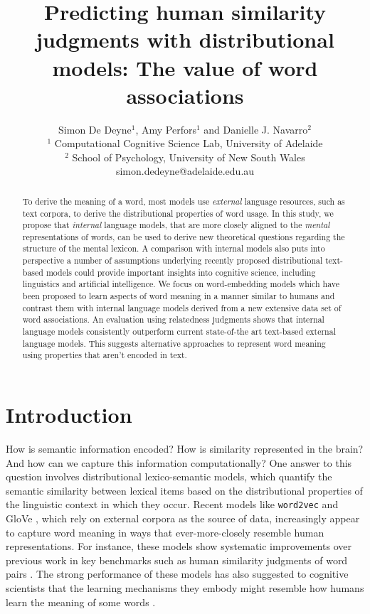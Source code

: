 \documentclass{article}
\title{Predicting human similarity judgments with distributional models: The value of word associations}
\author{Simon De Deyne$^1$, Amy Perfors$^1$ and Danielle J. Navarro$^2$ \\
$^1$ Computational Cognitive Science Lab, University of Adelaide  \\
$^2$ School of Psychology, University of New South Wales\\
 simon.dedeyne@adelaide.edu.au}
\date{}
\begin{document}
\maketitle

\begin{abstract}

To derive the meaning of a word, most models use \textit{external} language resources, such as text corpora, to derive the distributional properties of word usage.
In this study, we propose that \textit{internal} language models, that are more closely aligned to the \textit{mental} representations of words, can be used to derive new theoretical questions regarding the structure of the mental lexicon. A comparison with internal models also puts into perspective a number of assumptions underlying recently proposed distributional text-based models could provide important insights into cognitive science, including linguistics and artificial intelligence.
We focus on word-embedding models which have been proposed to learn aspects of word meaning in a manner similar to humans and contrast them with internal language models derived from a new extensive data set of word associations.
An evaluation using relatedness judgments shows that internal language models consistently outperform current state-of-the art text-based external language models. This suggests alternative approaches to represent word meaning using properties that aren't encoded in text.
\end{abstract}

\section{Introduction}

\label{intro}
How is semantic information encoded? How is similarity represented in the brain? And how can we capture this information computationally? One answer to this question involves distributional lexico-semantic models, which quantify the semantic similarity between lexical items based on the distributional properties of the linguistic context in which they occur. Recent models like \texttt{word2vec} \cite{mikolov2013efficient} and GloVe \cite{Pennington2014glove}, which rely on external corpora as the source of data, increasingly appear to capture word meaning in ways that ever-more-closely resemble human representations. For instance, these models show systematic improvements over previous work in key benchmarks such as human similarity judgments of word pairs \cite{BaroniDinu2014}. The strong performance of these models has also suggested to cognitive scientists that the learning mechanisms they embody might resemble how humans learn the meaning of some words \cite{Mandera2016Semantic}.
\end{document}
